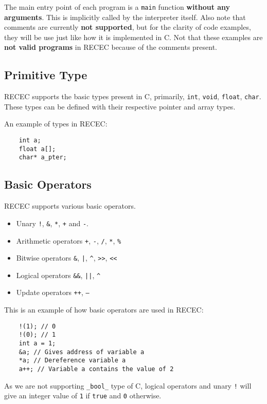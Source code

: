 \documentclass[a4paper]{article}
\begin{document}
The main entry point of each program is a \texttt{main} function \textbf{without any arguments}. This is implicitly called by the interpreter itself. Also note that comments are currently \textbf{not supported}, but for the clarity of code examples, they will be use just like how it is implemented in C. Not that these examples are \textbf{not valid programs} in RECEC because of the comments present.  

\subsection{Primitive Type}
\label{types}
RECEC supports the basic types present in C, primarily, \texttt{int}, \texttt{void}, \texttt{float}, \texttt{char}. These types can be defined with their respective pointer and array types. 

An example of types in RECEC:

\begin{verbatim}
	int a;
	float a[];
	char* a_pter;
\end{verbatim}

\subsection{Basic Operators}
RECEC supports various basic operators.

\begin{itemize}
	\item Unary \texttt{!}, \texttt{\&}, \texttt{*}, \texttt{+} and \texttt{-}.
	\item Arithmetic operators \texttt{+}, \texttt{-}, \texttt{/}, \texttt{*}, \texttt{\%}
	\item Bitwise operators \texttt{\&}, \texttt{|}, \texttt{\^},  \texttt{>>}, \texttt{<<}
	\item Logical operators \texttt{\&\&}, \texttt{||}, \texttt{\^}
	\item Update operators \texttt{++}, \texttt{--}
\end{itemize}

This is an example of how basic operators are used in RECEC: 

\begin{verbatim}
	!(1); // 0
	!(0); // 1
	int a = 1;
	&a; // Gives address of variable a
	*a; // Dereference variable a
	a++; // Variable a contains the value of 2
\end{verbatim}

As we are not supporting \texttt{\_bool\_} type of C, logical operators and unary \texttt{!} will give an integer value of \texttt{1} if \texttt{true} and \texttt{0} otherwise. 
\end{document}
